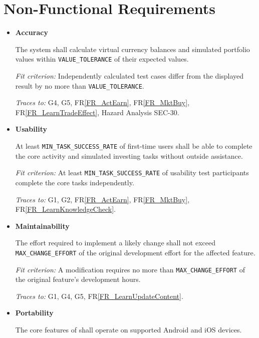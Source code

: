 \documentclass[12pt]{article}
\newcommand{\rref}[1]{FR\ref{#1}}
\newcounter{nfrnum} %
\begin{document}
\section{Non-Functional Requirements}
\noindent 
\begin{itemize}

\item[NFR\refstepcounter{nfrnum}\thenfrnum \label{NFR_Accuracy}:]
  \textbf{Accuracy}

  The system shall calculate virtual currency balances and simulated portfolio
  values within \texttt{VALUE\_TOLERANCE} of their expected values.

  \textit{Fit criterion:} Independently calculated test cases differ from the
  displayed result by no more than \texttt{VALUE\_TOLERANCE}.

  \textit{Traces to:} G4, G5,
  \rref{FR_ActEarn}, \rref{FR_MktBuy},
  \rref{FR_LearnTradeEffect}, Hazard Analysis SEC-30.

\item[NFR\refstepcounter{nfrnum}\thenfrnum \label{NFR_Usability}:]
  \textbf{Usability}

  At least \texttt{MIN\_TASK\_SUCCESS\_RATE} of first-time users shall be able
  to complete the core activity and simulated investing tasks without outside
  assistance.

  \textit{Fit criterion:} At least \texttt{MIN\_TASK\_SUCCESS\_RATE} of
  usability test participants complete the core tasks independently.

  \textit{Traces to:} G1, G2,
  \rref{FR_ActEarn}, \rref{FR_MktBuy},
  \rref{FR_LearnKnowledgeCheck}.

\item[NFR\refstepcounter{nfrnum}\thenfrnum \label{NFR_Maintainability}:]
  \textbf{Maintainability}

  The effort required to implement a likely change shall not exceed
  \texttt{MAX\_CHANGE\_EFFORT} of the original development effort for the
  affected feature.

  \textit{Fit criterion:} A modification requires no more than
  \texttt{MAX\_CHANGE\_EFFORT} of the original feature's development hours.

  \textit{Traces to:} G1, G4, G5,
  \rref{FR_LearnUpdateContent}.

\item[NFR\refstepcounter{nfrnum}\thenfrnum \label{NFR_Portability}:]
  \textbf{Portability}

  The core features of \progname{} shall operate on supported Android and iOS
  devices.


\end{itemize}
\end{document}
